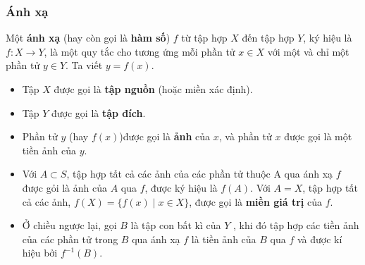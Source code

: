 \subsubsection{Ánh xạ}

\begin{definition}[Ánh xạ]
    Một \textbf{ánh xạ} (hay còn gọi là \textbf{hàm số}) $f$ từ tập hợp $X$ đến tập hợp $Y$, ký hiệu là $f: X \to Y$, là một quy tắc cho tương ứng mỗi phần tử $x \in X$ với một và chỉ một phần tử $y \in Y$. Ta viết $y = f(x)$.
    \begin{itemize}
        \item Tập $X$ được gọi là \textbf{tập nguồn} (hoặc miền xác định).
        
        \item Tập $Y$ được gọi là \textbf{tập đích}.
        
        \item Phần tử $y$ (hay $f(x)$)được gọi là \textbf{ảnh} của $x$, và phần tử $x$ được gọi là một tiền ảnh của $y$.
        
        \item Với $A \subset S$, tập hợp tất cả các ảnh của các phần tử thuộc A qua ánh xạ $f$ được gỏi là ảnh của $A$ qua $f$, được ký hiệu là $f(A)$. Với $A = X$, tập hợp tất cả các ảnh, $f(X) = \{f(x) \mid x \in X\}$, được gọi là \textbf{miền giá trị} của $f$.

        \item Ở chiều ngược lại, gọi $B$ là tập con bất kì của $Y$ , khi đó tập hợp các tiền ảnh của các phần tử trong $B$ qua ánh xạ $f$ là tiền ảnh của $B$ qua $f$ và được kí hiệu bởi $f^{-1}(B)$.
    \end{itemize}
\end{definition}

